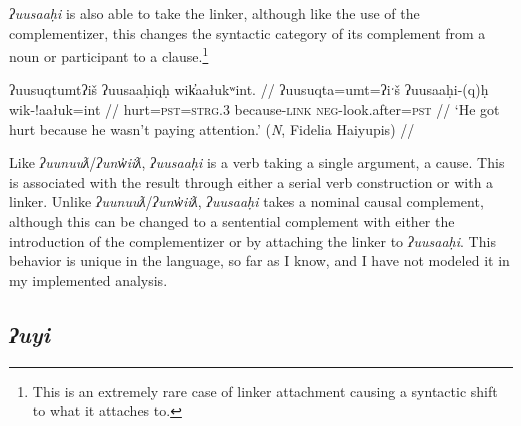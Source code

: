 \textit{ʔuusaaḥi} is also able to take the linker, although like the use of the complementizer, this changes the syntactic category of its complement from a noun or participant to a clause.\footnote{This is an extremely rare case of linker attachment causing a syntactic shift to what it attaches to.}

\ex \label{ex:uusahiqh}
\begingl
\glpreamble ʔuusuqtumtʔiš ʔuusaaḥiqḥ wik̓aałukʷint. //
\gla ʔuusuqta=umt=ʔiˑš ʔuusaaḥi-(q)ḥ wik-!aałuk=int //
\glb hurt=\textsc{pst}=\textsc{strg.3} because-\textsc{link} \textsc{neg}-look.after=\textsc{pst}  //
\glft `He got hurt because he wasn't paying attention.' (\textit{N}, Fidelia Haiyupis) //
\endgl
\xe



Like \textit{ʔuunuuƛ}/\textit{ʔunw̓iiƛ}, \textit{ʔuusaaḥi} is a verb taking a single argument, a cause. This is associated with the result through either a serial verb construction or with a linker. Unlike \textit{ʔuunuuƛ}/\textit{ʔunw̓iiƛ}, \textit{ʔuusaaḥi} takes a nominal causal complement, although this can be changed to a sentential complement with either the introduction of the complementizer or by attaching the linker to \textit{ʔuusaaḥi}. This behavior is unique in the language, so far as I know, and I have not modeled it in my implemented analysis.

\subsection{\textit{ʔuyi}} \label{ch:link:uyi}

